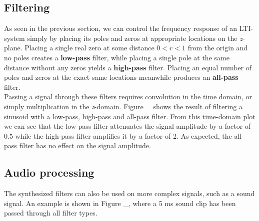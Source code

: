 \documentclass[journal]{IEEEtran}
\begin{document}
\subsection{Filtering} 
As seen in the previous section, we can control the frequency response of an LTI-system simply by placing its poles and zeros at appropriate locations on the \textit{z}-plane. Placing a single real zero at some distance $0<r<1$ from the origin and no poles creates a \textbf{low-pass} filter, while placing a single pole at the same distance without any zeros yields a \textbf{high-pass} filter. Placing an equal number of poles and zeros at the exact same locations meanwhile produces an \textbf{all-pass} filter. \\
Passing a signal through these filters requires convolution in the time domain, or simply multiplication in the \textit{z}-domain. Figure \_ shows the result of filtering a sinusoid with a low-pass, high-pass and all-pass filter. From this time-domain plot we can see that the low-pass filter attenuates the signal amplitude by a factor of $0.5$ while the high-pass filter amplifies it by a factor of 2. As expected, the all-pass filter has no effect on the signal amplitude. 

\subsection{Audio processing}
The synthesized filters can also be used on more complex signals, such as a sound signal. An example is shown in Figure \_, where a 5 ms sound clip has been passed through all filter types. 
\end{document}
